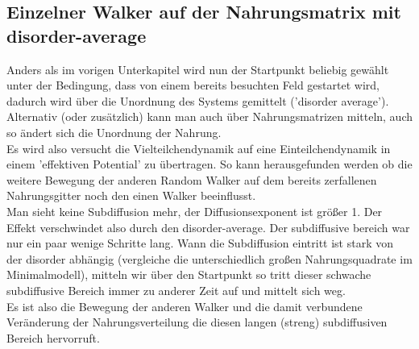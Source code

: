 \documentclass[a4paper, 12pt]{report}
\begin{document}
\subsection{Einzelner Walker auf der Nahrungsmatrix mit disorder-average}
Anders als im vorigen Unterkapitel wird nun der Startpunkt beliebig gewählt unter der Bedingung, dass von einem bereits besuchten Feld gestartet wird, dadurch wird über die Unordnung des Systems gemittelt ('disorder average'). Alternativ (oder zusätzlich) kann man auch über Nahrungsmatrizen mitteln, auch so ändert sich die Unordnung der Nahrung. 
\\
\noindent Es wird also versucht die Vielteilchendynamik auf eine Einteilchendynamik in einem 'effektiven Potential' zu übertragen. So kann herausgefunden werden ob die weitere Bewegung der anderen Random Walker auf dem bereits zerfallenen Nahrungsgitter noch den einen Walker beeinflusst.
\\
\noindent Man sieht keine Subdiffusion mehr, der Diffusionsexponent ist größer 1. Der Effekt verschwindet also durch den disorder-average. Der subdiffusive bereich war nur ein paar wenige Schritte lang. Wann die Subdiffusion eintritt ist stark von der disorder abhängig (vergleiche die unterschiedlich großen Nahrungsquadrate im Minimalmodell), mitteln wir über den Startpunkt so tritt dieser schwache subdiffusive Bereich immer zu anderer Zeit auf und mittelt sich weg.
\\
\noindent Es ist also die Bewegung der anderen Walker und die damit verbundene Veränderung der Nahrungsverteilung die diesen langen (streng) subdiffusiven Bereich hervorruft.
\end{document}
